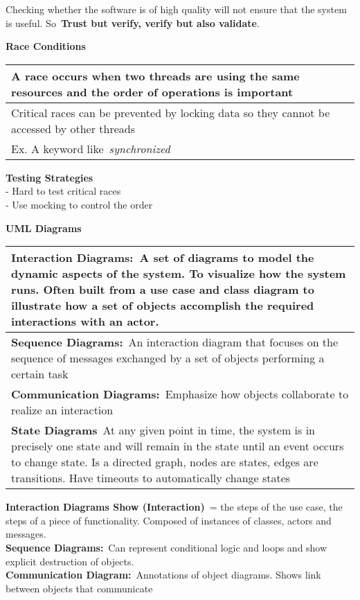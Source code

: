 Checking whether the software is of high quality will not ensure that
the system is useful. So~\textbf{Trust but verify, verify but also
	valida­te}.

\textbf{Race Conditions}\label{race-conditions}

\begin{longtable}[]{@{}l@{}}
	\toprule
	A race occurs when two threads are using the same resources and the
	order of operations is important\tabularnewline
	\midrule
	\endhead
	Critical races can be prevented by locking data so they cannot be
	accessed by other threads\tabularnewline
	Ex. A keyword like~\emph{synch­ron­ized}\tabularnewline
	\bottomrule
\end{longtable}

\textbf{Testing Strate­gies}\\
- Hard to test critical races\\
- Use mocking to control the order

\textbf{UML Diagrams}\label{uml-diagrams}

\begin{longtable}[]{@{}l@{}}
	\toprule
	\textbf{Inte­raction Diagra­ms:}~A set of diagrams to model the dynamic
	aspects of the system. To visualize how the system runs. Often built
	from a use case and class diagram to illustrate how a set of objects
	accomplish the required intera­ctions with an actor.\tabularnewline
	\midrule
	\endhead
	\textbf{Sequence Diagra­ms:}~An intera­ction diagram that focuses on the
	sequence of messages exchanged by a set of objects performing a certain
	task\tabularnewline
	\textbf{Comm­uni­cation Diagra­ms:}~Emphasize how objects collab­orate
	to realize an intera­ction\tabularnewline
	\textbf{State Diagrams}~At any given point in time, the system is in
	precisely one state and will remain in the state until an event occurs
	to change state. Is a directed graph, nodes are states, edges are
	transi­tions. Have timeouts to automa­tically change
	states\tabularnewline
	\bottomrule
\end{longtable}

\textbf{Inte­raction Diagrams Show (Inter­act­ion)}~= the steps of the
use case, the steps of a piece of functi­ona­lity. Composed of instances
of classes, actors and messages.~\\
\textbf{Sequence Diagra­ms:}~Can represent condit­ional logic and loops
and show explicit destru­ction of objects.\\
\textbf{Comm­uni­cation Diagram:}~Annota­tions of object diagrams. Shows
link between objects that commun­icate

